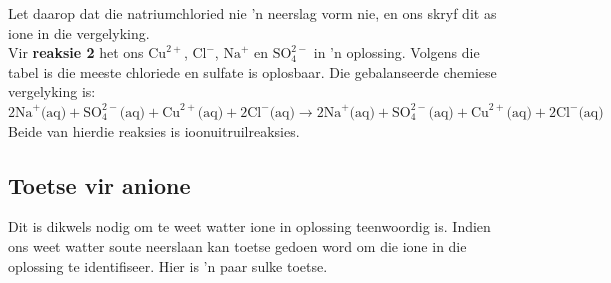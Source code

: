Let daarop dat die natriumchloried nie   'n neerslag vorm nie, en ons skryf dit as ione in die vergelyking. \\
Vir \textbf{reaksie 2} het ons ${\text{Cu}}^{2+}$, ${\text{Cl}}^{-}$, ${\text{Na}}^{+}$ en $\text{SO}_{4}^{2-}$ in  'n oplossing. Volgens die tabel is die meeste chloriede en sulfate is oplosbaar. Die gebalanseerde chemiese vergelyking is: \\
$2{\text{Na}}^{+} \text{(aq)} + \text{SO}_{4}^{2-} \text{(aq)} + {\text{Cu}}^{2+} \text{(aq)} + 2{\text{Cl}}^{-} \text{(aq)} \to 2{\text{Na}}^{+} \text{(aq)} + \text{SO}_{4}^{2-} \text{(aq)} + {\text{Cu}}^{2+} \text{(aq)} + 2{\text{Cl}}^{-} \text{(aq)} $
Beide van hierdie reaksies is ioonuitruilreaksies.
	\par
\subsection*{Toetse vir anione}
Dit is dikwels nodig om te weet watter ione in oplossing teenwoordig is. Indien ons weet watter soute neerslaan kan toetse gedoen word om die ione in die oplossing te identifiseer. Hier is  'n paar sulke toetse.


      \label{m38719*uid70}
